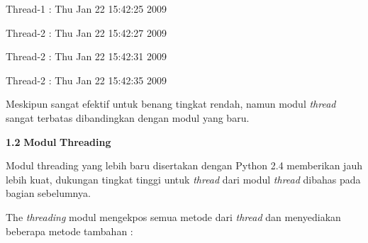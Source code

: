 \documentclass[a4paper,12pt]{report}
\begin{document}
\noindent 
\begin{center}{\fontsize{10pt}{10pt}\selectfont Thread-1 : Thu Jan 22 15:42:25 2009}\end{center} \par
\noindent 
\begin{center}{\fontsize{10pt}{10pt}\selectfont Thread-2 : Thu Jan 22 15:42:27 2009}\end{center} \par
\noindent 
\begin{center}{\fontsize{10pt}{10pt}\selectfont Thread-2 : Thu Jan 22 15:42:31 2009}\end{center} \par
\noindent 
\begin{center}{\fontsize{10pt}{10pt}\selectfont Thread-2 : Thu Jan 22 15:42:35 2009}\end{center} \par
\vspace{12pt}
Meskipun sangat efektif untuk benang tingkat rendah, namun modul \textit{thread} sangat terbatas dibandingkan dengan modul yang baru. \par
\vspace{12pt}
\vspace{12pt}
\vspace{12pt}
\textbf{1.2 }\textbf{Modul}\textbf{ Threading } \par
Modul threading yang lebih baru disertakan dengan Python 2.4 memberikan jauh lebih kuat, dukungan tingkat tinggi untuk \textit{thread}\textit{ }dari modul\textit{ }\textit{thread}\textit{ }dibahas pada bagian sebelumnya. \par
The \textit{thread}\textit{ing }modul mengekpos semua metode dari \textit{thread}\textit{ }dan menyediakan beberapa metode tambahan : \par
\end{document}
